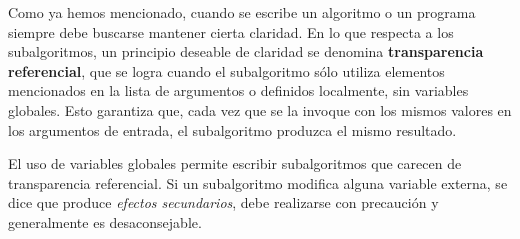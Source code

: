 \documentclass[]{book}
\begin{document}
Como ya hemos mencionado, cuando se escribe un algoritmo o un programa
siempre debe buscarse mantener cierta claridad. En lo que respecta a los
subalgoritmos, un principio deseable de claridad se denomina
\textbf{transparencia referencial}, que se logra cuando el subalgoritmo
sólo utiliza elementos mencionados en la lista de argumentos o definidos
localmente, sin variables globales. Esto garantiza que, cada vez que se
la invoque con los mismos valores en los argumentos de entrada, el
subalgoritmo produzca el mismo resultado.

El uso de variables globales permite escribir subalgoritmos que carecen
de transparencia referencial. Si un subalgoritmo modifica alguna
variable externa, se dice que produce \emph{efectos secundarios}, debe
realizarse con precaución y generalmente es desaconsejable.


\end{document}
